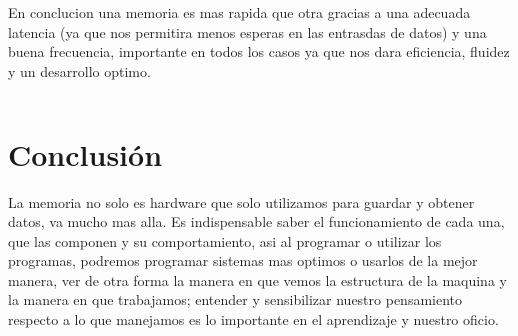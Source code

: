 \documentclass{article}
\begin{document}
    En conclucion una memoria es mas rapida que otra gracias a una adecuada latencia (ya que nos permitira menos esperas en las entrasdas de datos) y una buena frecuencia, importante en todos los casos ya que nos dara eficiencia, fluidez y un desarrollo optimo.

\begin{lstlisting}

\end{lstlisting}

\section{Conclusión} \label{conclulsion}
La memoria no solo es hardware que solo utilizamos para guardar y obtener datos, va mucho mas alla. Es indispensable saber el funcionamiento de cada una, que las componen y su comportamiento, asi al programar o utilizar los programas, podremos programar sistemas mas optimos o usarlos de la mejor manera, ver de otra forma la manera en que vemos la estructura de la maquina y la manera en que trabajamos; entender y sensibilizar nuestro pensamiento respecto a lo que manejamos es lo importante en el aprendizaje y nuestro oficio.



\end{document}
